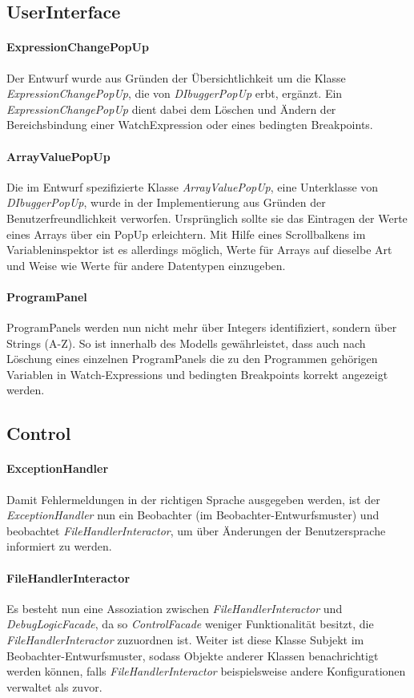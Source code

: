 \documentclass[parskip=full]{scrartcl}
\begin{document}
\subsection{UserInterface}
\paragraph{ExpressionChangePopUp}
Der Entwurf wurde aus Gründen der Übersichtlichkeit um die Klasse \textit{ExpressionChangePopUp}, die von \textit{DIbuggerPopUp} erbt, ergänzt. Ein \textit{ExpressionChangePopUp} dient dabei dem Löschen und Ändern der Bereichsbindung einer WatchExpression oder eines bedingten Breakpoints.
\paragraph{ArrayValuePopUp}
Die im Entwurf spezifizierte Klasse \textit{ArrayValuePopUp}, eine Unterklasse von \textit{DIbuggerPopUp}, wurde in der Implementierung aus Gründen der Benutzerfreundlichkeit verworfen. Ursprünglich sollte sie das Eintragen der Werte eines Arrays über ein PopUp erleichtern. Mit Hilfe eines Scrollbalkens im Variableninspektor ist es allerdings möglich, Werte für Arrays auf dieselbe Art und Weise wie Werte für andere Datentypen einzugeben.
\paragraph{ProgramPanel}
ProgramPanels werden nun nicht mehr über Integers identifiziert, sondern über Strings (A-Z). So ist innerhalb des Modells gewährleistet, dass auch nach Löschung eines einzelnen ProgramPanels die zu den Programmen gehörigen Variablen in Watch-Expressions und bedingten Breakpoints korrekt angezeigt werden.
\subsection{Control}
\paragraph{ExceptionHandler}
Damit Fehlermeldungen in der richtigen Sprache ausgegeben werden, ist der \textit{ExceptionHandler} nun ein Beobachter (im Beobachter-Entwurfsmuster) und beobachtet \textit{FileHandlerInteractor}, um über Änderungen der Benutzersprache informiert zu werden.
\paragraph{FileHandlerInteractor}
Es besteht nun eine Assoziation zwischen \textit{FileHandlerInteractor} und \textit{DebugLogicFacade}, da so \textit{ControlFacade} weniger Funktionalität besitzt, die \textit{FileHandlerInteractor} zuzuordnen ist.
Weiter ist diese Klasse Subjekt im Beobachter-Entwurfsmuster, sodass Objekte anderer Klassen benachrichtigt werden können, falls \textit{FileHandlerInteractor} beispielsweise andere Konfigurationen verwaltet als zuvor.
\end{document}
